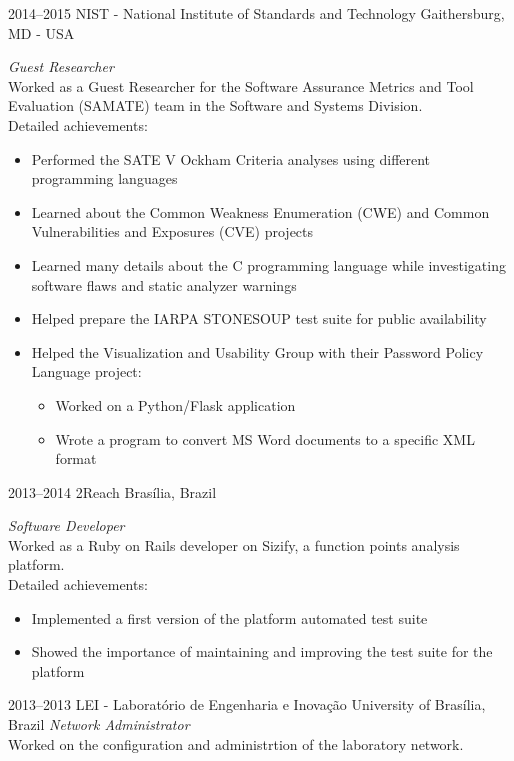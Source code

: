 \documentclass[]{friggeri-cv} %
\begin{document}
\begin{entrylist}
\entry
{2014--2015}
{NIST - National Institute of Standards and Technology}
{Gaithersburg, MD - USA}
{\emph{Guest Researcher} \\
  Worked as a Guest Researcher for the Software Assurance Metrics and Tool Evaluation (SAMATE) team in the Software and Systems Division. \\
Detailed achievements:
\begin{itemize}
\item Performed the SATE V Ockham Criteria analyses using different programming languages
\item Learned about the Common Weakness Enumeration (CWE) and Common Vulnerabilities and Exposures (CVE) projects
\item Learned many details about the C programming language while investigating software flaws and static analyzer warnings
\item Helped prepare the IARPA STONESOUP test suite for public availability
\item Helped the Visualization and Usability Group with their Password Policy Language project:
  \begin{itemize}
    \item Worked on a Python/Flask application
    \item Wrote a program to convert MS Word documents to a specific XML format
  \end{itemize}
\end{itemize}}


\entry
{2013--2014}
{2Reach}
{Brasília, Brazil}
{\emph{Software Developer} \\
  Worked as a Ruby on Rails developer on Sizify, a function points analysis platform. \\
Detailed achievements:
\begin{itemize}
  \item Implemented a first version of the platform automated test suite
  \item Showed the importance of maintaining and improving the test suite for the platform
\end{itemize}}

\entry
{2013--2013}
{LEI - Laboratório de Engenharia e Inovação}
{University of Brasília, Brazil}
{\emph{Network Administrator} \\
  Worked on the configuration and administrtion of the laboratory network. \\

}
\end{entrylist}
\end{document}
